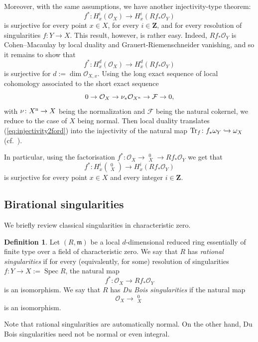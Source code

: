 \documentclass[letterpaper,11pt]{amsart}
\DeclareMathOperator{\DDB}{\underline{\Omega}}
\theoremstyle{plain}
\theoremstyle{definition}
\newtheorem{defi}[thm]{Definition}
\theoremstyle{remark}
\def\Z{{\mathbf Z}}
\def\cF{\mathcal{F}}
\def\cO{\mathcal{O}}
\def\frm{\mathfrak{m}}
\DeclareMathOperator{\Spec} {Spec}
\begin{document}
Moreover, with the same assumptions, we have another injectivity-type theorem:
\begin{equation} \label{eq:injectivity2}
f^* \colon H^i_x(\cO_X) \to H^i_x(Rf_*\cO_Y)
\end{equation}
is surjective for every point $x \in X$, for every $i\in \Z$, and for every resolution of singularities $f \colon Y \to X$. This result, however, is rather easy. Indeed, $Rf_*\cO_Y$ is Cohen--Macaulay by local duality and Grauert-Riemenschneider vanishing, and so it remains to show that
\begin{equation} \label{eq:injectivity2ford}
f^* \colon H^d_x(\cO_X) \to H^d_x(Rf_*\cO_Y)
\end{equation}
is surjective for $d := \dim \cO_{X,x}$. Using the long exact sequence of local cohomology associated to the short exact sequence
\[
0 \to \cO_X \to \nu_* \cO_{X^{\rm n}} \to \cF \to 0,
\]
with $\nu \colon X^{\rm n} \to X$ being the normalization and $\cF$ being the natural cokernel, we reduce to the case of $X$ being normal. Then local duality translates (\ref{eq:injectivity2ford}) into  the injectivity of the natural map ${\rm Tr}_f \colon f_*\omega_Y \hookrightarrow \omega_X$  (cf.\ \cite[Tag 0AWK]{stacks-project}).

In particular, using the factorisation $f^* \colon \cO_X \to \DDB^0_X \to Rf_*\cO_Y$ we get that
\begin{equation} \label{eq:injectivity3}
f^* \colon H^i_x(\DDB^0_X) \to H^i_x(Rf_*\cO_Y)
\end{equation}
is surjective for every point $x \in X$ and every integer $i \in \Z$.


\subsection{Birational singularities}
We briefly review classical singularities in characteristic zero.
\begin{defi} \label{def:DuBoisRational}
Let $(R,\frm)$ be a local $d$-dimensional reduced ring essentially of finite type over a field of characteristic zero. We say that $R$ has \emph{rational singularities} if for every (equivalently, for some) resolution of singularities $f \colon Y \to X := \Spec R$, the natural map
\[
f^* \colon \cO_X \to Rf_*\cO_Y
\]
is an isomorphism. We say that $R$ has \emph{Du Bois singularities} if the natural map
\[
\cO_X \to \DDB^0_X
\]
is an isomorphism.
\end{defi}
\noindent  Note that rational singularities are automatically normal. On the other hand, Du Bois singularities need not be normal or even integral.
\end{document}
